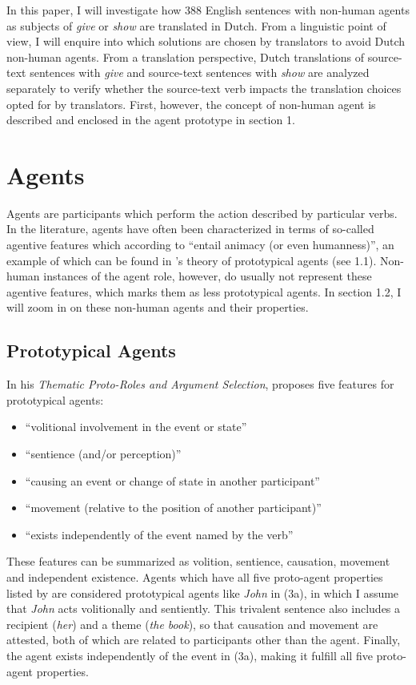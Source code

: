 \documentclass[output=paper]{LSP/langsci}
\begin{document}
In this paper, I will investigate how 388 English sentences with non-human agents as subjects of \textit{give} or \textit{show} are translated in Dutch. From a linguistic point of view, I will enquire into which solutions are chosen by translators to avoid Dutch non-human agents. From a translation perspective, Dutch translations of source-text sentences with \textit{give} and source-text sentences with \textit{show} are analyzed separately to verify whether the source-text verb impacts the translation choices opted for by translators. First, however, the concept of non-human agent is described and enclosed in the agent prototype in section 1. 

\section{Agents} 

Agents are participants which perform the action described by particular verbs. In the literature, agents have often been characterized in terms of so-called agentive features which according to \citet[49]{Hundt2004} “entail animacy (or even humanness)”, an example of which can be found in \citeauthor{Dowty1991}'s \citeyear{Dowty1991} theory of prototypical agents (see 1.1). Non-human instances of the agent role, however, do usually not represent these agentive features, which marks them as less prototypical agents. In section 1.2, I will zoom in on these non-human agents and their properties. 

\subsection{Prototypical Agents}
In his \textit{Thematic Proto-Roles and Argument Selection}, \citet[572]{Dowty1991} proposes five features for prototypical agents:

\begin{itemize}
\item “volitional involvement in the event or state”
\item “sentience (and/or perception)”
\item “causing an event or change of state in another participant”
\item “movement (relative to the position of another participant)”
\item “exists independently of the event named by the verb”
\end{itemize}

These features can be summarized as volition, sentience, causation, movement and independent existence. Agents which have all five proto-agent properties listed by \citet{Dowty1991} are considered prototypical agents like \textit{John} in (3a), in which I assume that \textit{John} acts volitionally and sentiently. This trivalent sentence also includes a recipient (\textit{her}) and a theme (\textit{the book}), so that causation and movement are attested, both of which are related to participants other than the agent. Finally, the agent exists independently of the event in (3a), making it fulfill all five proto-agent properties.
\end{document}
